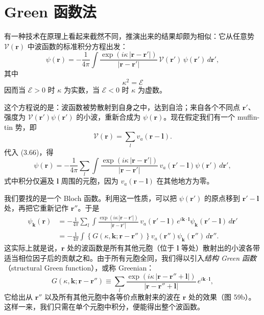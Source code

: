 \section{Green 函数法}

有一种技术在原理上看起来截然不同，推演出来的结果却颇为相似：它从任意势 $\mathcal{V}(\mathbf{r})$ 中波函数的标准积分方程出发：
\begin{equation*}
\psi(\mathbf{r})=-\frac{1}{4\pi}\int\frac{\exp(i\kappa\,|\mathbf{r}-\mathbf{r}'|)}{|\mathbf{r}-\mathbf{r}'|}\,\mathcal{V}(\mathbf{r}')\,\psi(\mathbf{r}')\,d\mathbf{r}',\tag{3.66}
\end{equation*}
其中
\begin{equation*}
\kappa^2=\mathcal{E}\tag{3.67}
\end{equation*}
因而当 $\mathcal{E}>0$ 时 $\kappa$ 为实数，当 $\mathcal{E}<0$ 时 $\kappa$ 为虚数。

这个方程说的是：波函数被势散射到自身之中，达到自洽；来自各个不同点 $\mathbf{r}'$、强度为 $\mathcal{V}(\mathbf{r}')\psi(\mathbf{r}')$ 的小波，重新合成为 $\psi(\mathbf{r})$。现在假定我们有一个 muffin-tin 势，即
\begin{equation*}
\mathcal{V}(\mathbf{r})=\sum_l v_a(\mathbf{r}-\mathbf{l}).\tag{3.68}
\end{equation*}
代入 (3.66)，得
\begin{equation*}
\psi(\mathbf{r})=-\frac{1}{4\pi}\sum_l\int\frac{\exp(i\kappa\,|\mathbf{r}-\mathbf{r}'|)}{|\mathbf{r}-\mathbf{r}'|}\,v_a(\mathbf{r}'-\mathbf{l})\psi(\mathbf{r}')\,d\mathbf{r}',\tag{3.69}
\end{equation*}
式中积分仅遍及 $\mathbf{l}$ 周围的元胞，因为 $v_a(\mathbf{r}-\mathbf{l})$ 在其他地方为零。

我们要找的是一个 Bloch 函数。利用这一性质，可以把 $\psi(\mathbf{r}')$ 的原点移到 $\mathbf{r}'-\mathbf{l}$ 处，再把它重新记作 $\mathbf{r}''$。于是
\begin{align*}
\psi_{\mathbf{k}}(\mathbf{r})&=-\frac{1}{4\pi}\sum_l\int\frac{\exp(i\kappa\,|\mathbf{r}-\mathbf{r}'|)}{|\mathbf{r}-\mathbf{r}'|}\,v_a(\mathbf{r}'-\mathbf{l})\,e^{i\mathbf{k}\cdot\mathbf{l}}\psi_{\mathbf{k}}(\mathbf{r}'-\mathbf{l})\,d\mathbf{r}'\\
&=-\frac{1}{4\pi}\int\left\{G(\kappa,\mathbf{k};\mathbf{r}-\mathbf{r}'')\right\}v_a(\mathbf{r}'')\psi_{\mathbf{k}}(\mathbf{r}'')\,d\mathbf{r}''.\tag{3.70}
\end{align*}
这实际上就是说，$\mathbf{r}$ 处的波函数是所有其他元胞（位于 $\mathbf{l}$ 等处）散射出的小波各带适当相位因子后的贡献之和。由于所有元胞全同，我们得以引入\emph{结构 Green 函数}（structural Green function），或称 Greenian：
\begin{equation*}
G(\kappa,\mathbf{k};\mathbf{r}-\mathbf{r}'')\equiv\sum_l\frac{\exp(i\kappa\,|\mathbf{r}-\mathbf{r}''+\mathbf{l}|)}{|\mathbf{r}-\mathbf{r}''+\mathbf{l}|}\,e^{i\mathbf{k}\cdot\mathbf{l}},\tag{3.71}
\end{equation*}
它给出从 $\mathbf{r}''$ 以及所有其他元胞中各等价点散射来的波在 $\mathbf{r}$ 处的效果（图 59b）。这样一来，我们只需在单个元胞中积分，便能得出整个波函数。

